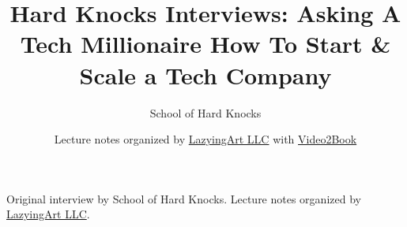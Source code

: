 \documentclass[11pt,oneside]{book}
\begin{document}
\frontmatter
\title{Hard Knocks Interviews: Asking A Tech Millionaire How To Start \& Scale a Tech Company}
\author{School of Hard Knocks}
\date{Lecture notes organized by \href{https://lazying.art}{LazyingArt LLC} with \href{https://github.com/lachlanchen/Video2Book}{Video2Book}}
\maketitle
\begin{center}
\small Original interview by School of Hard Knocks. Lecture notes organized by \href{https://lazying.art}{LazyingArt LLC}.
\end{center}
\clearpage
\mainmatter

\end{document}
